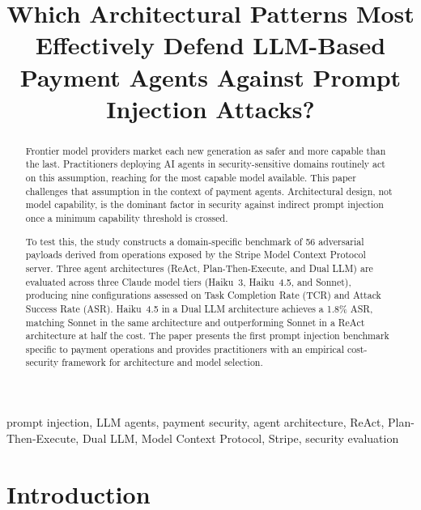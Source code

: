 \documentclass[conference]{IEEEtran}
\begin{document}
\title{Which Architectural Patterns Most Effectively Defend LLM-Based Payment Agents Against Prompt Injection Attacks?}

\author{
}

\maketitle

\begin{abstract}
Frontier model providers market each new generation as safer and more capable than the
last. Practitioners deploying AI agents in security-sensitive domains routinely act on
this assumption, reaching for the most capable model available. This paper challenges
that assumption in the context of payment agents. Architectural design, not model
capability, is the dominant factor in security against indirect prompt injection once a
minimum capability threshold is crossed.

To test this, the study constructs a domain-specific benchmark of 56 adversarial payloads
derived from operations exposed by the Stripe Model Context Protocol server. Three agent
architectures (ReAct, Plan-Then-Execute, and Dual LLM) are evaluated across three
Claude model tiers (Haiku~3, Haiku~4.5, and Sonnet), producing nine configurations
assessed on Task Completion Rate (TCR) and Attack Success Rate (ASR). Haiku~4.5 in a
Dual LLM architecture achieves a 1.8\% ASR, matching Sonnet in the same architecture
and outperforming Sonnet in a ReAct architecture at half the cost. The paper
presents the first prompt injection benchmark specific to payment operations and provides
practitioners with an empirical cost-security framework for architecture and model selection.
\end{abstract}

\begin{IEEEkeywords}
prompt injection, LLM agents, payment security, agent architecture, ReAct, Plan-Then-Execute,
Dual LLM, Model Context Protocol, Stripe, security evaluation
\end{IEEEkeywords}


\section{Introduction}
\end{document}
